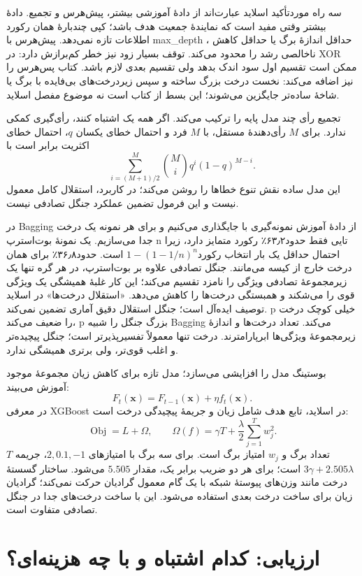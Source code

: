 \documentclass[12pt,a4paper,oneside]{report}
\begin{document}
سه راه موردتأکید اسلاید عبارت‌اند از دادهٔ آموزشی بیشتر، پیش‌هرس و تجمیع. دادهٔ بیشتر وقتی مفید است که نمایندهٔ جمعیت هدف باشد؛ کپی چندبارهٔ همان رکورد اطلاعات تازه نمی‌دهد. پیش‌هرس با max\_depth ، حداقل اندازهٔ برگ یا حداقل کاهش ناخالصی رشد را محدود می‌کند. توقف بسیار زود نیز خطر کم‌برازش دارد: در XOR ممکن است تقسیم اول سود اندک بدهد ولی تقسیم بعدی لازم باشد. کتاب پس‌هرس را نیز اضافه می‌کند: نخست درخت بزرگ ساخته و سپس زیر‌درخت‌های بی‌فایده با برگ یا شاخهٔ ساده‌تر جایگزین می‌شوند؛ این بسط از کتاب است نه موضوع مفصل اسلاید.

تجمیع  رأی چند مدل پایه را ترکیب می‌کند. اگر همه یک اشتباه کنند، رأی‌گیری کمکی ندارد. برای $M$ رأی‌دهندهٔ مستقل، با $M$ فرد و احتمال خطای یکسان $q$، احتمال خطای اکثریت برابر است با
\[\sum_{i=(M+1)/2}^{M}\binom Mi q^i(1-q)^{M-i}.\]
این مدل ساده نقش تنوع خطاها را روشن می‌کند؛ در کاربرد، استقلال کامل معمول نیست و این فرمول تضمین عملکرد جنگل تصادفی نیست.

در Bagging از دادهٔ آموزش نمونه‌گیری با جایگذاری می‌کنیم و برای هر نمونه یک درخت جدا می‌سازیم. یک نمونهٔ بوت‌استرپ n تایی فقط حدود۶۳٫۲٪ رکورد متمایز دارد، زیرا احتمال حداقل یک بار انتخاب رکورد$1-(1-1/n)^n$ است. حدود۳۶٫۸٪ برای همان درخت خارج از کیسه می‌مانند. جنگل تصادفی علاوه بر بوت‌استرپ، در هر گره تنها یک زیرمجموعهٔ تصادفی ویژگی را نامزد تقسیم می‌کند؛ این کار غلبهٔ همیشگی یک ویژگی قوی را می‌شکند و همبستگی درخت‌ها را کاهش می‌دهد. «استقلال درخت‌ها» در اسلاید توصیف ایده‌آل است؛ جنگل استقلال دقیق آماری تضمین نمی‌کند. p خیلی کوچک درخت را ضعیف می‌کند، p بزرگ جنگل را شبیه Bagging می‌کند. تعداد درخت‌ها و اندازهٔ زیرمجموعهٔ ویژگی‌ها ابرپارامترند. درخت تنها معمولاً تفسیرپذیرتر است؛ جنگل پیچیده‌تر و اغلب قوی‌تر، ولی برتری همیشگی ندارد.

بوستینگ مدل را افزایشی می‌سازد؛ مدل تازه برای کاهش زیان مجموعهٔ موجود آموزش می‌بیند:
\[F_t(\mathbf x)=F_{t-1}(\mathbf x)+\eta f_t(\mathbf x).\]
در معرفی XGBoost در اسلاید، تابع هدف شامل زیان و جریمهٔ پیچیدگی درخت است:
\[\operatorname{Obj}=L+\Omega,\qquad \Omega(f)=\gamma T+\frac\lambda2\sum_{j=1}^{T}w_j^2.\]
$T$ تعداد برگ و $w_j$ امتیاز برگ است. برای سه برگ با امتیازهای $2,0.1,-1$، جریمه $3\gamma+2.505\lambda$ است؛ برای هر دو ضریب برابر یک، مقدار $5.505$ می‌شود. ساختار گسستهٔ درخت مانند وزن‌های پیوستهٔ شبکه با یک گام معمول گرادیان حرکت نمی‌کند؛ گرادیان زیان برای ساخت درخت بعدی استفاده می‌شود. این با ساخت درخت‌های جدا در جنگل تصادفی متفاوت است.



\section{ارزیابی: کدام اشتباه و با چه هزینه‌ای؟}
\end{document}
